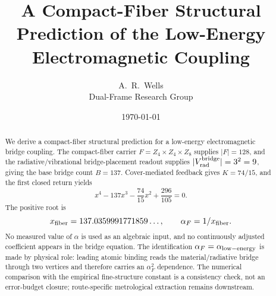 \documentclass[11pt]{article}
\title{A Compact-Fiber Structural Prediction of the Low-Energy Electromagnetic Coupling}
\author{A.\ R.\ Wells\\
Dual-Frame Research Group}
\date{\today}
\begin{document}
\maketitle

\begin{abstract}
We derive a compact-fiber structural prediction for a low-energy
electromagnetic bridge coupling. The compact-fiber carrier
\(F=Z_4\times Z_4\times Z_8\) supplies \(|F|=128\), and the
radiative/vibrational bridge-placement readout supplies
\(|V_{\rm rad}^{\rm bridge}|=3^2=9\), giving the base bridge count
\(B=137\). Cover-mediated feedback gives \(K=74/15\), and the first
closed return yields
\[
x^4-137x^3-\frac{74}{15}x^2+\frac{296}{105}=0.
\]
The positive root is
\[
x_{\rm fiber}=137.0359991771859\ldots,
\qquad
\alpha_F=1/x_{\rm fiber}.
\]
No measured value of \(\alpha\) is used as an algebraic input, and no
continuously adjusted coefficient appears in the bridge equation. The
identification \(\alpha_F=\alpha_{\rm low-energy}\) is made by physical
role: leading atomic binding reads the material/radiative bridge through
two vertices and therefore carries an \(\alpha_F^2\) dependence. The
numerical comparison with the empirical fine-structure constant is a
consistency check, not an error-budget closure; route-specific
metrological extraction remains downstream.
\end{abstract}

\tableofcontents















\end{document}
